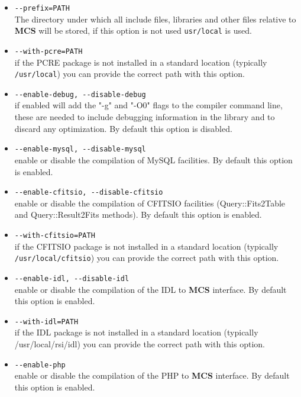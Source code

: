 \documentclass[12pt,titlepage]{book}
\newcommand{\mcs}{\textbf{MCS} }
\begin{document}
\begin{itemize}
\item \verb|--prefix=PATH| \\ The directory under which all include files,
  libraries and other files relative to \mcs will be stored, if this
  option is not used \verb|usr/local| is used.

\item \verb|--with-pcre=PATH| \\ if the PCRE package is not installed
  in a standard location (typically \verb|/usr/local|) you can provide
  the correct path with this option.

\item \verb|--enable-debug, --disable-debug| \\ if enabled will add
  the "-g" and "-O0" flags to the compiler command line, these are
  needed to include debugging information in the library and to
  discard any optimization. By default this option is disabled.


\item \verb|--enable-mysql, --disable-mysql| \\ enable or disable
  the compilation of MySQL facilities. By default this option is
  enabled.


\item \verb|--enable-cfitsio, --disable-cfitsio| \\ enable or disable
  the compilation of CFITSIO facilities (Query::Fits2Table and
  Query::Result2Fits methods). By default this option is enabled.

\item \verb|--with-cfitsio=PATH| \\ if the CFITSIO package is not
  installed in a standard location (typically
  \verb|/usr/local/cfitsio|) you can provide the correct path with
  this option.


\item \verb|--enable-idl, --disable-idl| \\ enable or disable the
  compilation of the IDL to \mcs interface. By default this option is
  enabled.

\item \verb|--with-idl=PATH| \\ if the IDL package is not installed in
  a standard location (typically /usr/local/rsi/idl) you can provide the
  correct path with this option.


\item \verb|--enable-php| \\ enable or disable the compilation of the
  PHP to \mcs interface. By default this option is enabled.
\end{itemize}
\end{document}
